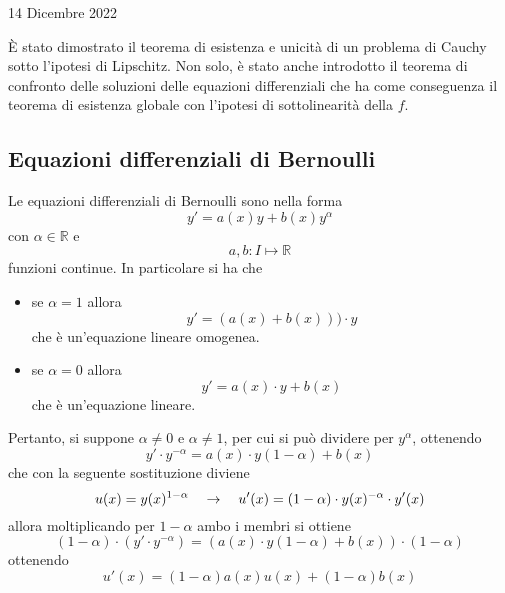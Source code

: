 \documentclass[a4paper]{extarticle}
\begin{document}
\newpage
\noindent
\begin{center}
    14 Dicembre 2022
\end{center}
\vspace{1em}
\noindent
È stato dimostrato il teorema di esistenza e unicità di un problema di Cauchy sotto l'ipotesi di Lipschitz. Non solo, è stato anche introdotto il teorema di confronto delle soluzioni delle equazioni differenziali che ha come conseguenza il teorema di esistenza globale con l'ipotesi di sottolinearità della $f$.

\vspace{1em}
\subsection{Equazioni differenziali di Bernoulli}
Le equazioni differenziali di Bernoulli sono nella forma
\[y'=a(x) y + b(x) y^\alpha\]
con $\alpha \in \mathbb{R}$ e
\[a,b : I \longmapsto \mathbb{R}\]
funzioni continue. In particolare si ha che
\begin{itemize}
    \item se $\alpha = 1$ allora
    \[y' = \left(a(x) + b(x)\right)) \cdot y\]
    che è un'equazione lineare omogenea.

    \item se $\alpha = 0$ allora
    \[y' = a(x) \cdot y + b(x)\]
    che è un'equazione lineare.
\end{itemize}
Pertanto, si suppone $\alpha \neq 0$ e $\alpha \neq 1$, per cui si può dividere per $y^\alpha$, ottenendo
\[y' \cdot y^{-\alpha} = a(x) \cdot y(1-\alpha) + b(x)\]
che con la seguente sostituzione diviene
\[u(x)=y(x)^{1-\alpha} \hspace{1em} \rightarrow \hspace*{1em} u'(x)=(1-\alpha) \cdot y(x)^{-\alpha} \cdot y'(x)\]
allora moltiplicando per $1-\alpha$ ambo i membri si ottiene 
\[(1-\alpha) \cdot (y' \cdot y^{-\alpha}) = (a(x) \cdot y(1-\alpha) + b(x)) \cdot (1-\alpha)\]
ottenendo
\[u'(x) = (1-\alpha) a(x) u(x) + (1-\alpha) b(x)\]
\end{document}
